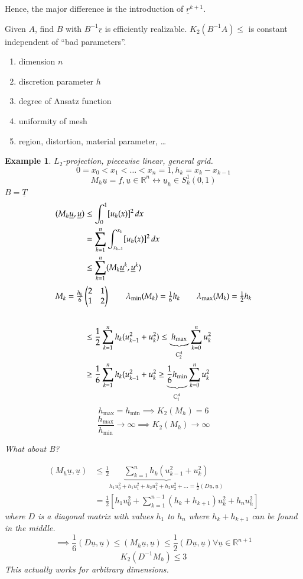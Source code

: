 \documentclass{article}
\newtheorem{example}{Example}
\begin{document}
Hence, the major difference is the introduction of $\underline r^{k+1}$.

Given $A$, find $B$ with $B^{-1} \underline r$ is efficiently realizable.
$K_2(B^{-1}A) \leq$ is constant independent of \enquote{bad parameters}.
\begin{enumerate}
  \item dimension $n$
  \item discretion parameter $h$ %
  \item degree of Ansatz function
  \item uniformity of mesh
  \item region, distortion, material parameter, \dots %
\end{enumerate}

\begin{example}
  $L_2$-projection, piecewise linear, general grid.
  \[ 0 = x_0 < x_1 < \ldots < x_n = 1, h_k = x_k - x_{k-1} \]
  \[ M_h \underline u = \underline f, \underline u \in \mathbb R^n \leftrightarrow \underline u_h \in S_k^1(0,1) \]
  $B = \underline T$
  \begin{align*}
    (M_h \underline u, \underline u)
      &\leq \int_0^1 [u_h(x)]^2 \, dx \\
      &= \sum_{k=1}^n \int_{x_{k-1}}^{x_k} [u_h(x)]^2 \, dx \\
      &\leq \sum_{k=1}^n (M_k \underline u^k, \underline u^k) \\
  \intertext{$M_k = \frac{h_k}{6} \begin{pmatrix} 2 & 1 \\ 1 & 2 \end{pmatrix} \qquad \lambda_{\min}(M_k) = \frac16 h_k \qquad \lambda_{\max}(M_k) = \frac12 h_k$} \\
      &\leq \frac12 \sum_{k=1}^n h_k (u^2_{k-1} + u_k^2) \leq \underbrace{h_{\text{max}}}_{C_2^A} \sum_{k=0}^n u_k^2 \\
      &\geq \frac16 \sum_{k=1}^n h_k (u_{k-1}^2 + u_k^2 \geq \underbrace{\frac16 h_{\text{min}}}_{C_1^A} \sum_{k=0}^n u_k^2
  \end{align*}
  \[ h_{\text{max}} = h_{\text{min}} \implies K_2(M_h) = 6 \]
  \[ \frac{h_{\text{max}}}{h_{\text{min}}} \to \infty \implies K_2(M_h) \to \infty \]

  What about B?

  \begin{align*}
    (M_h \underline u, \underline u)
      &\leq \frac12 \underbrace{\sum_{k=1}^n h_k (u_{k-1}^2 + u_k^2)}_{h_1 u_0^2 + h_1 u_1^2 + h_2 u_1^2 + h_2 u_2^2 + \ldots = \frac12 (D \underline u, \underline u)} \\
      &= \frac12 \left[ h_1 u_0^2 + \sum_{k=1}^{n-1} (h_k + h_{k+1}) u_k^2 + h_n u_h^2 \right]
  \end{align*}
  where $D$ is a diagonal matrix with values $h_1$ to $h_n$ where $h_k + h_{k+1}$ can be found in the middle.
  \[ \implies \frac16 (D \underline u, \underline u) \leq (M_h \underline u, \underline u) \leq \frac12 (D \underline u, \underline u) \forall \underline u \in \mathbb R^{n+1} \]
  \[ K_2(D^{-1}M_h) \leq 3 \]
  This actually works for arbitrary dimensions.
\end{example}
\end{document}
